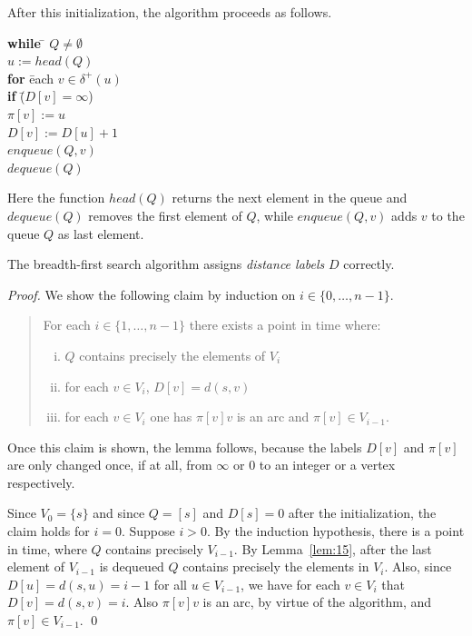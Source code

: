 After this initialization, the algorithm proceeds as follows. 

\begin{tabbing}
  {\bf while} \= $Q \neq \emptyset$  \\
              \> $u := head(Q)$ \\
              \> {\bf for} \= each $v \in \delta^+(u)$ \\
              \>           \> {\bf if} \= ($D[v]=\infty$) \\
              \>           \>          \> $\pi[v]:=u$ \\ 
              \>           \>          \> $D[v]:=D[u]+1$ \\
              \>           \>          \> $enqueue(Q,v)$ \\
              \> $dequeue(Q)$ 
\end{tabbing}

Here the function $head(Q)$ returns the next element in the queue and
$dequeue(Q)$ removes the first element of $Q$, while $enqueue(Q,v)$
adds $v$ to the queue $Q$ as last element.



\begin{lemma}
  \label{lem:17}
  The breadth-first search algorithm assigns \emph{distance labels} $D$
  correctly. 
\end{lemma}


\begin{proof}  
  We show the following claim by induction on $i \in \{0,\ldots,n-1\}$. 
  \begin{quote}
    For each $i \in \{1,\ldots,n-1\}$ there exists a point in time where:
    \begin{enumerate}[i)]
    \item     $Q$ contains precisely  the elements  of $V_i$
      \label{item:f1}
    \item for each $v \in V_i$,  $D[v] = d(s,v)$ \label{item:f2}
    \item for each $v \in V_i$  one has   $\pi[v]v$
      is an arc and $\pi[v] \in V_{i-1}$. 
    \end{enumerate}
  \end{quote}
Once this claim is shown, the lemma follows, because the labels $D[v]$
and $\pi[v]$ are only changed once, if at all, from $\infty$ or $0$ 
to an integer
or a vertex respectively. 

Since $V_0 = \{s\}$ and since  $Q = [s]$ and $D[s] = 0$ after the initialization, the
claim holds for $ i = 0$. Suppose $i>0$. By the induction hypothesis,
there is a point in time, where  $Q$ contains precisely $V_{i-1}$. By
Lemma~\ref{lem:15}, after the last element of $V_{i-1}$ is dequeued
$Q$ contains precisely the elements in $V_i$. Also, since $D[u] =
d(s,u) = i-1$ for all $u \in V_{i-1}$, we have for each $v \in V_i$ that  $D[v]
= d(s,v)=i$. Also $\pi[v]v$ is an arc, by virtue of the algorithm, and
$\pi[v] \in V_{i-1}$.  \qed 
\end{proof}

